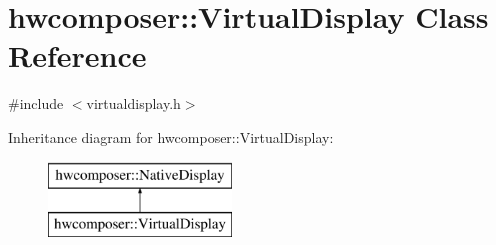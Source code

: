 \hypertarget{classhwcomposer_1_1VirtualDisplay}{}\section{hwcomposer\+:\+:Virtual\+Display Class Reference}
\label{classhwcomposer_1_1VirtualDisplay}


{\ttfamily \#include $<$virtualdisplay.\+h$>$}

Inheritance diagram for hwcomposer\+:\+:Virtual\+Display\+:\begin{figure}[H]
\begin{center}
\leavevmode
\includegraphics[height=2.000000cm]{classhwcomposer_1_1VirtualDisplay}
\end{center}
\end{figure}
